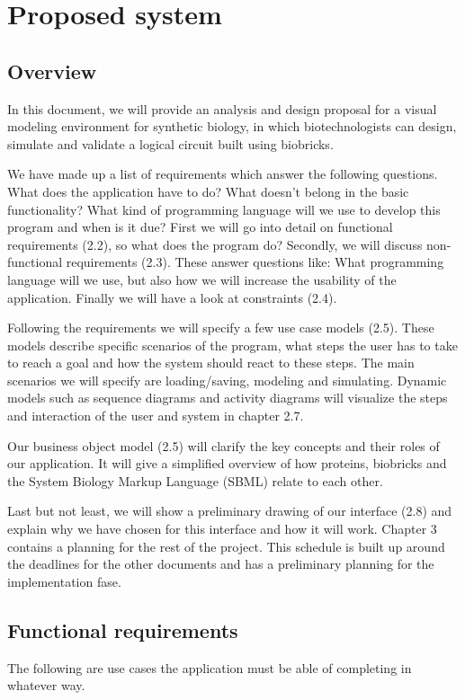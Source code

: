 \documentclass[a4paper]{article}
\begin{document}
\section{Proposed system}
\subsection{Overview} 		%
In this document, we will provide an analysis and design proposal for a visual modeling environment for synthetic biology, in which biotechnologists can design, simulate and validate a logical circuit built using biobricks.

We have made up a list of requirements which answer the following questions.  What does the application have to do? What doesn't belong in the basic functionality? What kind of programming language will we use to develop this program and when is it due? First we will go into detail on functional requirements (2.2), so what does the program do? Secondly, we will discuss non-functional requirements (2.3). These answer questions like: What programming language will we use, but also how we will increase the usability of the application. Finally we will have a look at constraints (2.4).

Following the requirements we will specify a few use case models (2.5). These models describe specific scenarios of the program, what steps the user has to take to reach a goal and how the system should react to these steps. The main scenarios we will specify are loading/saving, modeling and simulating. Dynamic models such as sequence diagrams and activity diagrams will visualize the steps and interaction of the user and system in chapter 2.7.

Our business object model (2.5) will clarify the key concepts and their roles of our application. It will give a simplified overview of how proteins, biobricks and the System Biology Markup Language (SBML) relate to each other.

Last but not least, we will show a preliminary drawing of our interface (2.8) and explain why we have chosen for this interface and how it will work. Chapter 3 contains a planning for the rest of the project. This schedule is built up around the deadlines for the other documents and has a preliminary planning for the implementation fase.

\pagebreak
\subsection{Functional requirements}
The following are use cases the application must be able of completing in whatever way.
\end{document}
